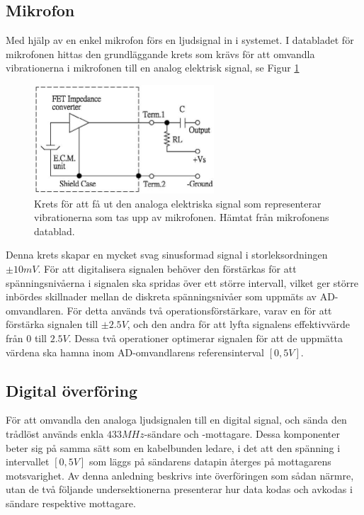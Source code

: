 \documentclass[a4paper,10pt]{article}
\begin{document}
\subsection{Mikrofon}

Med hjälp av en enkel mikrofon \cite{mikrofon} förs en ljudsignal in i systemet. 
I databladet för mikrofonen hittas den grundläggande krets som krävs för att 
omvandla vibrationerna i mikrofonen till en analog elektrisk signal, se Figur 
\ref{fig:mikrofon} 

\begin{figure}[h]
    \centering
    \includegraphics[width=0.6\textwidth]{mik.jpg}
    \caption{Krets för att få ut den analoga elektriska signal som representerar
	     vibrationerna som tas upp av mikrofonen. Hämtat från mikrofonens
	     datablad.}
    \label{fig:mikrofon}
\end{figure}

Denna krets skapar en mycket svag sinusformad signal i storleksordningen 
$\pm 10 mV$. För att digitalisera signalen behöver den förstärkas för att 
spänningsnivåerna i signalen ska spridas över ett större intervall, vilket ger 
större inbördes skillnader mellan de diskreta spänningsnivåer som uppmäts av 
AD-omvandlaren. För detta används två operationsförstärkare, varav en för att 
förstärka signalen till $\pm 2.5 V$, och den andra för att lyfta signalens 
effektivvärde från $0$ till $2.5 V$. Dessa två operationer optimerar signalen
för att de uppmätta värdena ska hamna inom AD-omvandlarens referensinterval
$[0,5V]$.

\subsection{Digital överföring}

För att omvandla den analoga ljudsignalen till en digital signal, och sända den 
trådlöst används enkla $433 MHz$-sändare och -mottagare. Dessa komponenter
beter sig på samma sätt som en kabelbunden ledare, i det att den spänning i 
intervallet $[0, 5V]$ som läggs på sändarens datapin återges på mottagarens
motsvarighet. Av denna anledning beskrivs inte överföringen som sådan närmre,
utan de två följande undersektionerna presenterar hur data kodas och avkodas
i sändare respektive mottagare.
\end{document}
